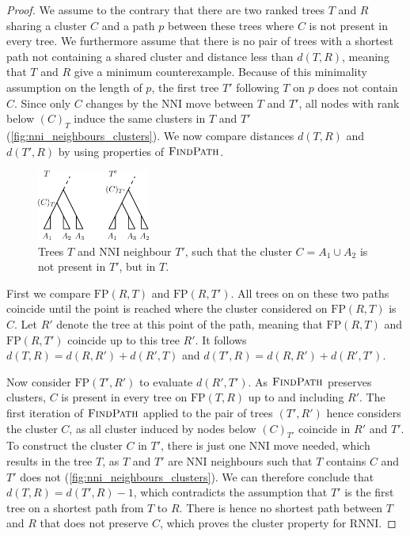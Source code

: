 \documentclass[11pt]{amsart}
\newcommand{\rnni}{\mathrm{RNNI}}
\newcommand{\findpath}{\textsc{FindPath}}
\newcommand{\nni}{\mathrm{NNI}}
\newcommand{\fp}{\mathrm{FP}}
\begin{document}
\begin{proof}
	We assume to the contrary that there are two ranked trees $T$ and $R$ sharing a cluster $C$ and a path $p$ between these trees where $C$ is not present in every tree.
	We furthermore assume that there is no pair of trees with a shortest path not containing a shared cluster and distance less than $d(T,R)$, meaning that $T$ and $R$ give a minimum counterexample.
	Because of this minimality assumption on the length of $p$, the first tree $T'$ following $T$ on $p$ does not contain $C$.
	Since only $C$ changes by the $\nni$ move between $T$ and $T'$, all nodes with rank below $(C)_T$ induce the same clusters in $T$ and $T'$ (\autoref{fig:nni_neighbours_clusters}).
	We now compare distances $d(T,R)$ and $d(T',R)$ by using properties of $\findpath$.

	\begin{figure}[ht]
		\includegraphics[width=0.33\textwidth]{nni_neighbours_clusters.eps}
		\caption{Trees $T$ and $\nni$ neighbour $T'$, such that the cluster $C = A_1 \cup A_2$ is not present in $T'$, but in $T$.}
		\label{fig:nni_neighbours_clusters}
	\end{figure}

	First we compare $\fp(R,T)$ and $\fp(R,T')$.
	All trees on on these two paths coincide until the point is reached where the cluster considered on $\fp(R,T)$ is $C$.
	Let $R'$ denote the tree at this point of the path, meaning that $\fp(R,T)$ and $\fp(R,T')$ coincide up to this tree $R'$.
	It follows $d(T,R) = d(R,R') + d(R', T)$ and $d(T',R) = d(R,R') + d(R', T')$.

	Now consider $\fp(T', R')$ to evaluate $d(R', T')$.
	As $\findpath$ preserves clusters, $C$ is present in every tree on $\fp(T,R)$ up to and including $R'$.
	The first iteration of $\findpath$ applied to the pair of trees $(T',R')$ hence considers the cluster $C$, as all cluster induced by nodes below $(C)_{T'}$ coincide in $R'$ and $T'$.
	To construct the cluster $C$ in $T'$, there is just one $\nni$ move needed, which results in the tree $T$, as $T$ and $T'$ are $\nni$ neighbours such that $T$ contains $C$ and $T'$ does not (\autoref{fig:nni_neighbours_clusters}).
	We can therefore conclude that $d(T,R) = d(T',R) - 1$, which contradicts the assumption that $T'$ is the first tree on a shortest path from $T$ to $R$.
	There is hence no shortest path between $T$ and $R$ that does not preserve $C$, which proves the cluster property for $\rnni$.
\end{proof}
\end{document}
